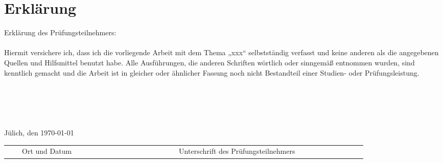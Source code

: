 \chapter{Erklärung}
Erklärung des Prüfungsteilnehmers:
\\
\\
Hiermit versichere ich, dass ich die vorliegende Arbeit mit dem Thema „xxx“ selbstständig verfasst und keine anderen als die angegebenen Quellen und Hilfsmittel benutzt habe. Alle Ausführungen, die anderen Schriften wörtlich oder sinngemäß entnommen wurden, sind kenntlich gemacht und die Arbeit ist in gleicher oder ähnlicher Fassung noch nicht Bestandteil einer Studien- oder Prüfungsleistung.
\\
\\
\\
\\
\\
\\\small{Jülich, den \today}\\
\begin{tabular}{r r r r r r r r r r r r r r r r r r r r r r r r r r r}
\cline{1-5} \cline{12-25}\\[-0.3cm]
& &\tiny{Ort und Datum}& & & & & & & & & & & & & & &\tiny{Unterschrift des Prüfungsteilnehmers}& & & & & & &\\
\end{tabular}
\cleardoublepage